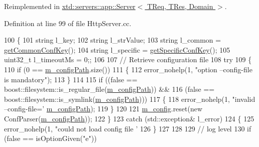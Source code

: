 Reimplemented in \hyperlink{classxtd_1_1servers_1_1app_1_1Server_a04ac2d5b3a0a229a3b54ef33b9b7056d}{xtd\+::servers\+::app\+::\+Server$<$ T\+Req, T\+Res, Domain $>$}.



Definition at line 99 of file Http\+Server.\+cc.


\begin{DoxyCode}
100 \{
101   \textcolor{keywordtype}{string}   l\_key;
102   \textcolor{keywordtype}{string}   l\_strValue;
103   \textcolor{keywordtype}{string}   l\_common    = \hyperlink{classxtd_1_1servers_1_1app_1_1HttpServer_a3c838a2599ff485454ca19790ae0529c}{getCommonConfKey}();
104   \textcolor{keywordtype}{string}   l\_specific  = \hyperlink{classxtd_1_1servers_1_1app_1_1HttpServer_a2b8fdc59d125cae41a833da5daf16d97}{getSpecificConfKey}();
105   uint32\_t l\_timeoutMs = 0;;
106 
107   \textcolor{comment}{// Retrieve configuration file}
108   \textcolor{keywordflow}{try}
109   \{
110     \textcolor{keywordflow}{if} (0 == \hyperlink{classxtd_1_1servers_1_1app_1_1HttpServer_aa07526617267875dd907e29b99711ab6}{m\_configPath}.size())
111     \{
112       error\_nohelp(1, \textcolor{stringliteral}{"option --config-file is mandatory"});
113     \}
114 
115     \textcolor{keywordflow}{if} ((\textcolor{keyword}{false} == boost::filesystem::is\_regular\_file(\hyperlink{classxtd_1_1servers_1_1app_1_1HttpServer_aa07526617267875dd907e29b99711ab6}{m\_configPath})) &&
116         (\textcolor{keyword}{false} == boost::filesystem::is\_symlink(\hyperlink{classxtd_1_1servers_1_1app_1_1HttpServer_aa07526617267875dd907e29b99711ab6}{m\_configPath})))
117     \{
118       error\_nohelp(1, \textcolor{stringliteral}{"invalid --config-file='%
      \hyperlink{classxtd_1_1servers_1_1app_1_1HttpServer_aa07526617267875dd907e29b99711ab6}{m\_configPath});
119     \}
120 
121     \hyperlink{classxtd_1_1servers_1_1app_1_1HttpServer_ada282c895467a8d2fcaee543560958dc}{m\_config}.reset(\textcolor{keyword}{new} ConfParser(\hyperlink{classxtd_1_1servers_1_1app_1_1HttpServer_aa07526617267875dd907e29b99711ab6}{m\_configPath}));
122   \}
123   \textcolor{keywordflow}{catch} (std::exception& l\_error)
124   \{
125     error\_nohelp(1, \textcolor{stringliteral}{"could not load config file '%
126   \}
127 
128 
129   \textcolor{comment}{// log level}
130   \textcolor{keywordflow}{if} (\textcolor{keyword}{false} == isOptionGiven(\textcolor{stringliteral}{"e"}))
}}
\end{DoxyCode}
